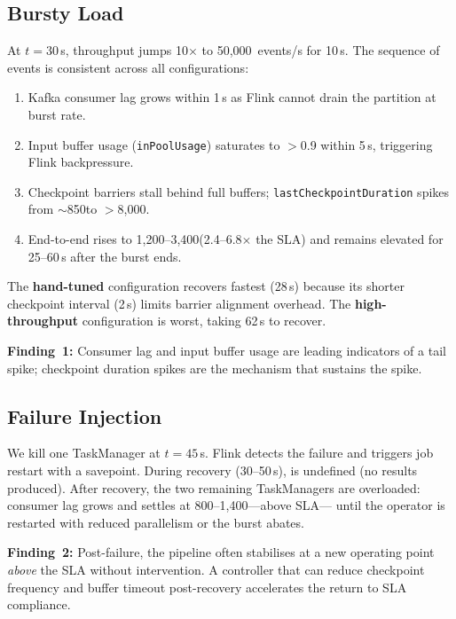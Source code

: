 \subsection{Bursty Load}
At $t=30$\,s, throughput jumps 10$\times$ to 50{,}000~events/s for 10\,s.
The sequence of events is consistent across all configurations:
\begin{enumerate}
  \item Kafka consumer lag grows within 1\,s as Flink cannot drain the
    partition at burst rate.
  \item Input buffer usage (\texttt{inPoolUsage}) saturates to $>$0.9
    within 5\,s, triggering Flink backpressure.
  \item Checkpoint barriers stall behind full buffers;
    \texttt{lastCheckpointDuration} spikes from $\sim$850\ms to
    $>$8{,}000\ms.
  \item End-to-end  rises to 1{,}200--3{,}400\ms (2.4--6.8$\times$
    the SLA) and remains elevated for 25--60\,s after the burst ends.
\end{enumerate}
The \textbf{hand-tuned} configuration recovers fastest (28\,s) because its
shorter checkpoint interval (2\,s) limits barrier alignment overhead.
The \textbf{high-throughput} configuration is worst, taking 62\,s to recover.

\textbf{Finding~1:} Consumer lag and input buffer usage are leading
indicators of a tail spike; checkpoint duration spikes are the mechanism
that sustains the spike.

\subsection{Failure Injection}
We kill one TaskManager at $t=45$\,s.
Flink detects the failure and triggers job restart with a savepoint.
During recovery (30--50\,s),  is undefined (no results produced).
After recovery, the two remaining TaskManagers are overloaded:
consumer lag grows and  settles at 800--1{,}400\ms---above SLA---
until the operator is restarted with reduced parallelism or the burst abates.

\textbf{Finding~2:} Post-failure, the pipeline often stabilises at a new
operating point \emph{above} the SLA without intervention. A controller
that can reduce checkpoint frequency and buffer timeout post-recovery
accelerates the return to SLA compliance.
